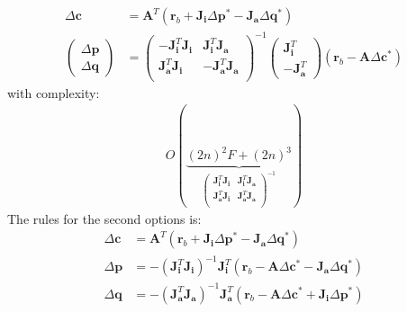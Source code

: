 \begin{equation}
    \begin{aligned}
        \Delta\mathbf{c}& = \mathbf{A}^T \left( \mathbf{r}_b + \mathbf{J}_{\mathbf{i}} \Delta\mathbf{p}^* - \mathbf{J}_{\mathbf{a}} \Delta\mathbf{q}^* \right)
        \\
        \begin{pmatrix}
            \Delta\mathbf{p}
            \\
            \Delta\mathbf{q}
        \end{pmatrix} & =
        \begin{pmatrix}
            -\mathbf{J}_{\mathbf{i}}^T \mathbf{J}_{\mathbf{i}} & \mathbf{J}_{\mathbf{i}}^T \mathbf{J}_{\mathbf{a}}
            \\
            \mathbf{J}_{\mathbf{a}}^T \mathbf{J}_{\mathbf{i}} & -\mathbf{J}_{\mathbf{a}}^T \mathbf{J}_{\mathbf{a}}
            \\
        \end{pmatrix}^{-1}
        \begin{pmatrix}
            \mathbf{J}_{\mathbf{i}}^T
            \\
            -\mathbf{J}_{\mathbf{a}}^T
        \end{pmatrix} \left(\mathbf{r}_b - \mathbf{A} \Delta\mathbf{c}^*\right)
        \label{eq:bidirectional_alt_solution1}
    \end{aligned}
\end{equation}
with complexity:
\begin{equation}
    \begin{aligned}
        O(\underbrace{(2n)^2F + (2n)^3}_{
        \begin{pmatrix}
            \mathbf{J}_{\mathbf{i}}^T \mathbf{J}_{\mathbf{i}} & \mathbf{J}_{\mathbf{i}}^T \mathbf{J}_{\mathbf{a}}
            \\
            \mathbf{J}_{\mathbf{a}}^T \mathbf{J}_{\mathbf{i}} & \mathbf{J}_{\mathbf{a}}^T \mathbf{J}_{\mathbf{a}}
            \\
        \end{pmatrix}^{-1}
        })
    \label{eq:complexity_alternated_bidirectional1}
    \end{aligned}
\end{equation}
The rules for the second options is:
\begin{equation}
    \begin{aligned}
        \Delta\mathbf{c} & = \mathbf{A}^T \left( \mathbf{r}_b + \mathbf{J}_{\mathbf{i}} \Delta\mathbf{p}^* - \mathbf{J}_{\mathbf{a}} \Delta\mathbf{q}^* \right)
        \\
        \Delta\mathbf{p} & = -(\mathbf{J}_{\mathbf{i}}^T\mathbf{J}_{\mathbf{i}})^{-1} \mathbf{J}_{\mathbf{i}}^T \left( \mathbf{r}_b - \mathbf{A} \Delta\mathbf{c}^* - \mathbf{J}_{\mathbf{a}} \Delta\mathbf{q}^* \right)
        \\
        \Delta\mathbf{q} & = -(\mathbf{J}_{\mathbf{a}}^T\mathbf{J}_{\mathbf{a}})^{-1} \mathbf{J}_{\mathbf{a}}^T \left( \mathbf{r}_b - \mathbf{A} \Delta\mathbf{c}^* + \mathbf{J}_{\mathbf{i}} \Delta\mathbf{p}^* \right)
        \label{eq:bidirectional_alt_solution2}
    \end{aligned}
\end{equation}
